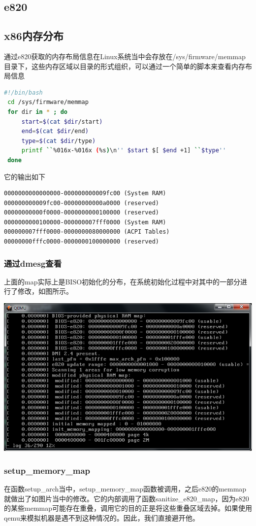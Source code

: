 \documentclass[b5paper,9pt,twoside,openany]{article}
\begin{document}
\subsection{e820}
\subsection{x86内存分布}
通过e820获取的内存布局信息在Linux系统当中会存放在/sys/firmware/memmap目录下，这些内存区域以目录的形式组织，可以通过一个简单的脚本来查看内存布局信息
\begin{lstlisting}[language=bash]
#!/bin/bash
 cd /sys/firmware/memmap
 for dir in * ; do
     start=$(cat $dir/start)
     end=$(cat $dir/end)
     type=$(cat $dir/type)
     printf ``%016x-%016x (%s)\n'' $start $[ $end +1] ``$type''
 done
\end{lstlisting}
它的输出如下
\begin{lstlisting}
0000000000000000-000000000009fc00 (System RAM)
000000000009fc00-00000000000a0000 (reserved)
00000000000f0000-0000000000100000 (reserved)
0000000000100000-000000007fff0000 (System RAM)
000000007fff0000-0000000080000000 (ACPI Tables)
00000000fffc0000-0000000100000000 (reserved)
\end{lstlisting}
\subsubsection{通过dmesg查看}
上面的map实际上是BISO初始化的分布，在系统初始化过程中对其中的一部分进行了修改，如图所示。

\includegraphics[scale=0.25]{images/e820}

\subsubsection{setup\_memory\_map}
在函数setup\_arch当中，setup\_memory\_map函数被调用，之后e820的memmap就做出了如图片当中的修改。它的内部调用了函数sanitize\_e820\_map，因为e820的某些memmap可能存在重叠，调用它的目的正是将这些重叠区域去掉。如果使用qemu来模拟机器是遇不到这种情况的。因此，我们直接避开他。
\end{document}
